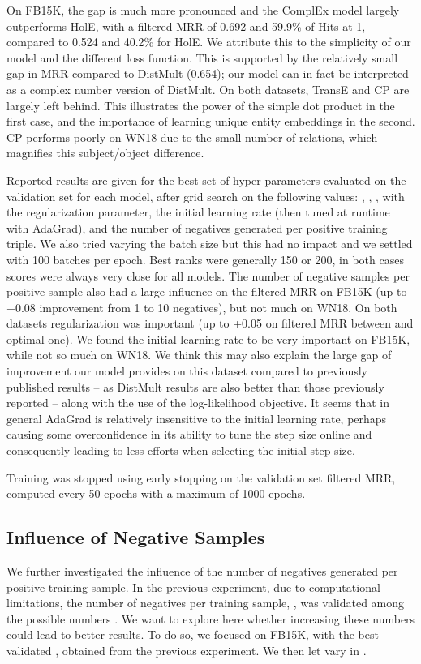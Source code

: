 \documentclass{article}
\begin{document}
On FB15K, the gap is much more pronounced and the ComplEx model largely outperforms HolE, with a filtered MRR of 0.692 and 59.9\% of Hits at 1, compared to 0.524 and 40.2\% for HolE. We attribute this to the simplicity of our model and the different loss function. This is supported by the relatively small gap in MRR compared to DistMult (0.654); our model can in fact be interpreted as a complex number version of DistMult. 
On both datasets, TransE and CP are largely left behind. This illustrates the power of the simple dot product in the first case, and the importance of learning unique entity embeddings in the second. CP performs poorly on WN18 due to the small number of \mbox{relations}, which magnifies this subject/object difference.



Reported results are given for the best set of hyper-parameters evaluated on the validation set for each model, after grid search on the following values: , , ,   with  the  regularization parameter,  the initial learning rate (then tuned at runtime with AdaGrad), and  the number of negatives generated per positive training triple. We also tried varying the batch size but this had no impact and we settled with 100 batches per epoch. Best ranks were generally 150 or 200, in both cases scores were always very close for all models. The number of negative samples per positive sample also had a large influence on the filtered MRR on FB15K (up to +0.08 improvement from 1 to 10 negatives), but not much on WN18. On both datasets regularization was important (up to +0.05 on filtered MRR between  and optimal one).
We found the initial learning rate to be very important on FB15K, while not so much on WN18. We think this may also explain the large gap of improvement our model provides on this dataset compared to previously published results -- as DistMult results are also better than those previously reported \cite{Yang2015} -- along with the use of the log-likelihood objective. It seems that in general AdaGrad is relatively insensitive to the initial learning rate, perhaps causing some overconfidence in its ability to tune the step size online and consequently leading to less efforts when selecting the initial step size.


Training was stopped using early stopping on the validation set filtered MRR, computed every 50 epochs with a maximum of 1000 epochs.

\subsection{Influence of Negative Samples}
We further investigated the influence of the number of negatives generated per positive training sample. In the previous experiment, due to computational limitations, the number of negatives per training sample, , was validated among the possible numbers . We want to explore here whether increasing these numbers could lead to better results. To do so, we focused on FB15K, with the best validated , obtained from the previous experiment. We then let  vary in .
\end{document}
